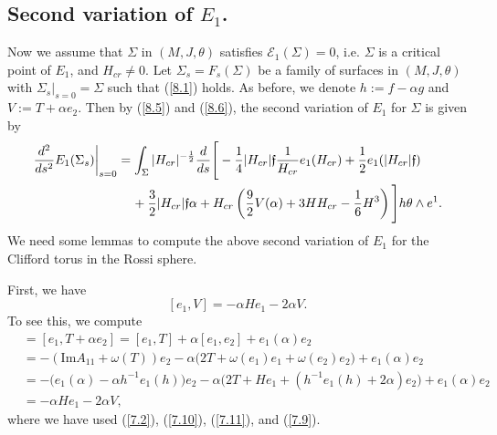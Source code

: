 \documentclass{amsart}
\theoremstyle{Corollary}
\numberwithin{equation}{section}
\begin{document}
\subsection{Second variation of $E_1$.}
Now we assume that $\Sigma$ in $(M,J,\theta)$
satisfies $\mathcal{E}_1(\Sigma)=0$, i.e. 
$\Sigma$ is a critical point of $E_1$, 
and $H_{cr}\neq 0$. 
Let $\Sigma_s=F_s(\Sigma)$
be a family of surfaces in $(M,J,\theta)$ 
with $\Sigma_s\big|_{s=0}=\Sigma$ such that 
(\ref{8.1}) holds. 
As before, we denote $h:=f-\alpha g$ and $V:=T+\alpha e_2$. 
Then by (\ref{8.5}) and (\ref{8.6}), 
the second variation of $E_1$ for $\Sigma$ is given by 
\begin{equation}\label{8.7}
\begin{split}
\left.\frac{d^2}{ds^2}E_1(\Sigma_s)\right|_{s=0} &=
\int_\Sigma|H_{cr}|^{-\frac{1}{2}}
\frac{d}{ds}\Bigg[-\frac{1}{4}|H_{cr}|\mathfrak{f}\frac{1}{H_{cr}}e_1(H_{cr})+\frac{1}{2}e_1(|H_{cr}|\mathfrak{f})\\
&\hspace{4mm}+\frac{3}{2}|H_{cr}|\mathfrak{f}\alpha+H_{cr}\left(\frac{9}{2}V(\alpha)+3H H_{cr}-\frac{1}{6}H^3\right)\Bigg] h\theta\wedge e^1.
\end{split}
\end{equation}
We need some lemmas to compute the above second variation of $E_1$
for the Clifford torus in the Rossi sphere. 


First, we have 
\begin{equation}\label{8.8}
[e_1,V]=-\alpha H e_1-2\alpha V.
\end{equation}
To see this, we compute
\begin{align*}
[e_1,V]
&=[e_1,T+\alpha e_2]=[e_1,T]+\alpha[e_1,e_2]+e_1(\alpha)e_2\\
&=-(\mbox{Im}A_{11}+\omega(T))e_2
-\alpha\big(2T+\omega(e_1)e_1+\omega(e_2)e_2\big)+e_1(\alpha)e_2\\
&=-\big(e_1(\alpha)-\alpha h^{-1}e_1(h)\big)e_2
-\alpha\big(2T+He_1+(h^{-1}e_1(h)+2\alpha)e_2\big)+e_1(\alpha)e_2\\
&=-\alpha He_1-2\alpha V,
\end{align*}
where we have used 
(\ref{7.2}), (\ref{7.10}), (\ref{7.11}), 
and (\ref{7.9}). 
\end{document}
